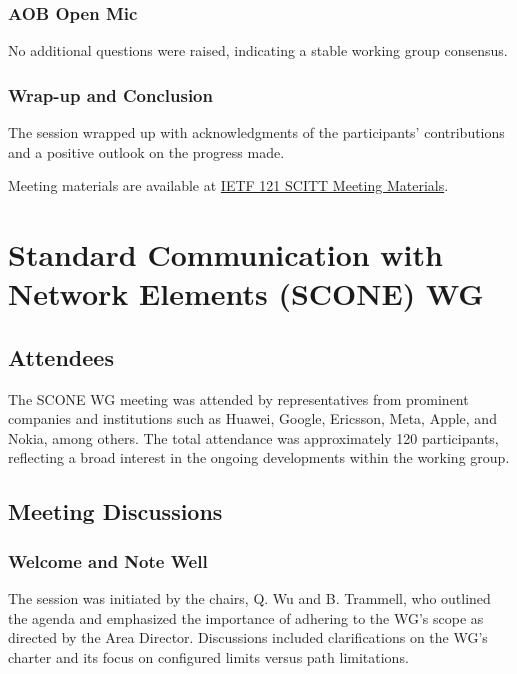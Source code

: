 \documentclass{article}
\begin{document}
\subsubsection{AOB Open Mic}

No additional questions were raised, indicating a stable working group consensus.

\subsubsection{Wrap-up and Conclusion}

The session wrapped up with acknowledgments of the participants' contributions and a positive outlook on the progress made.

Meeting materials are available at \href{https://www.ietf.org/proceedings/121/scitt.html}{IETF 121 SCITT Meeting Materials}.




\newpage

\section{Standard Communication with Network Elements (SCONE) WG}

\subsection{Attendees}

The SCONE WG meeting was attended by representatives from prominent companies and institutions such as Huawei, Google, Ericsson, Meta, Apple, and Nokia, among others. The total attendance was approximately 120 participants, reflecting a broad interest in the ongoing developments within the working group.

\subsection{Meeting Discussions}

\subsubsection{Welcome and Note Well}

The session was initiated by the chairs, Q. Wu and B. Trammell, who outlined the agenda and emphasized the importance of adhering to the WG's scope as directed by the Area Director. Discussions included clarifications on the WG's charter and its focus on configured limits versus path limitations.
\end{document}
